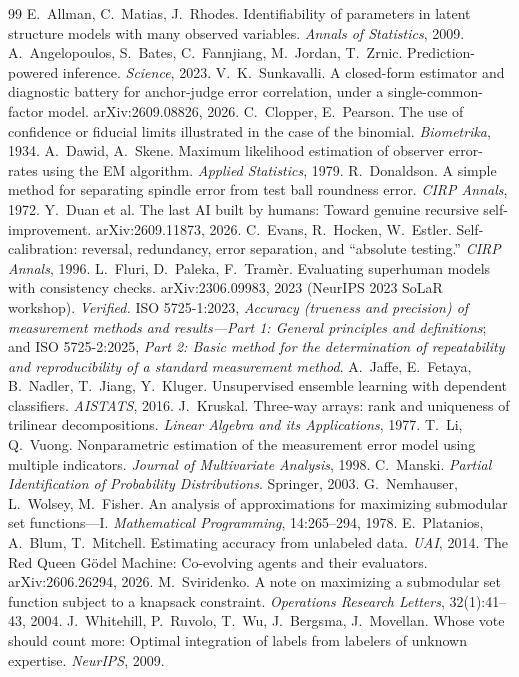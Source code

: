 \documentclass[11pt]{article}
\theoremstyle{definition}
\theoremstyle{remark}
\begin{document}
\begin{thebibliography}{99}\footnotesize\setlength{\itemsep}{0pt}
 E.~Allman, C.~Matias, J.~Rhodes. Identifiability of parameters in latent structure models with many observed variables. \emph{Annals of Statistics}, 2009.
 A.~Angelopoulos, S.~Bates, C.~Fannjiang, M.~Jordan, T.~Zrnic. Prediction-powered inference. \emph{Science}, 2023.
 V.~K.~Sunkavalli. A closed-form estimator and diagnostic battery for anchor-judge error correlation, under a single-common-factor model. arXiv:2609.08826, 2026.
 C.~Clopper, E.~Pearson. The use of confidence or fiducial limits illustrated in the case of the binomial. \emph{Biometrika}, 1934.
 A.~Dawid, A.~Skene. Maximum likelihood estimation of observer error-rates using the EM algorithm. \emph{Applied Statistics}, 1979.
 R.~Donaldson. A simple method for separating spindle error from test ball roundness error. \emph{CIRP Annals}, 1972.
 Y.~Duan et al. The last AI built by humans: Toward genuine recursive self-improvement. arXiv:2609.11873, 2026.
 C.~Evans, R.~Hocken, W.~Estler. Self-calibration: reversal, redundancy, error separation, and ``absolute testing.'' \emph{CIRP Annals}, 1996.
 L.~Fluri, D.~Paleka, F.~Tram\`er. Evaluating superhuman models with consistency checks. arXiv:2306.09983, 2023 (NeurIPS 2023 SoLaR workshop). \emph{Verified.}
 ISO 5725-1:2023, \emph{Accuracy (trueness and precision) of measurement methods and results---Part 1: General principles and definitions}; and ISO 5725-2:2025, \emph{Part 2: Basic method for the determination of repeatability and reproducibility of a standard measurement method}.
 A.~Jaffe, E.~Fetaya, B.~Nadler, T.~Jiang, Y.~Kluger. Unsupervised ensemble learning with dependent classifiers. \emph{AISTATS}, 2016.
 J.~Kruskal. Three-way arrays: rank and uniqueness of trilinear decompositions. \emph{Linear Algebra and its Applications}, 1977.
 T.~Li, Q.~Vuong. Nonparametric estimation of the measurement error model using multiple indicators. \emph{Journal of Multivariate Analysis}, 1998.
 C.~Manski. \emph{Partial Identification of Probability Distributions}. Springer, 2003.
 G.~Nemhauser, L.~Wolsey, M.~Fisher. An analysis of approximations for maximizing submodular set functions---I. \emph{Mathematical Programming}, 14:265--294, 1978.
 E.~Platanios, A.~Blum, T.~Mitchell. Estimating accuracy from unlabeled data. \emph{UAI}, 2014.
 The Red Queen G\"odel Machine: Co-evolving agents and their evaluators. arXiv:2606.26294, 2026.
 M.~Sviridenko. A note on maximizing a submodular set function subject to a knapsack constraint. \emph{Operations Research Letters}, 32(1):41--43, 2004.
 J.~Whitehill, P.~Ruvolo, T.~Wu, J.~Bergsma, J.~Movellan. Whose vote should count more: Optimal integration of labels from labelers of unknown expertise. \emph{NeurIPS}, 2009.
\end{thebibliography}
\end{document}
